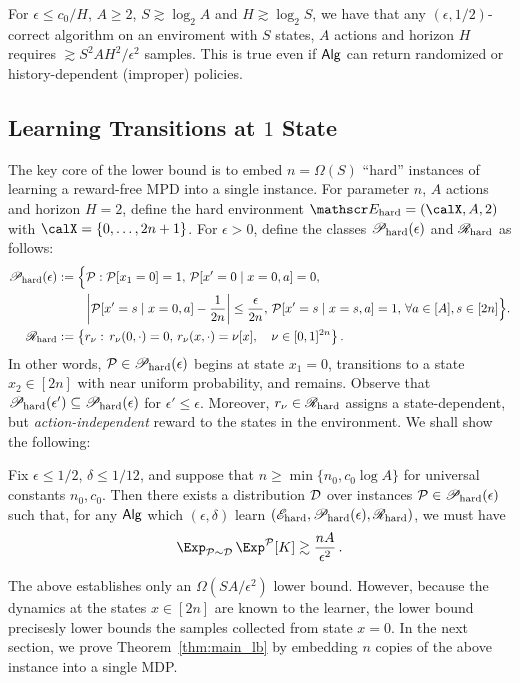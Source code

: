 \begin{theorem}\label{thm:main_lb} For $\epsilon \le c_0/H$, $A \ge 2$, $S \gtrsim \log_2 A$ and $H \gtrsim \log_2 S$, we have that any $(\epsilon,1/2)$-correct algorithm on an enviroment with $S$ states, $A$ actions and horizon $H$ requires $\gtrsim S^2 A H^2/\epsilon^2$ samples. This is true even if $\mathsf{Alg}$ can return randomized or history-dependent (improper) policies. 
\end{theorem}


\subsection{Learning Transitions at $1$ State}

The key core of the lower bound is to embed $n = \Omega(S)$  ``hard'' instances of learning a reward-free MPD into a single instance. For parameter $n$, $A$ actions and horizon $H = 2$, define the hard environment $\Ehard = (\calX,A,2)$ with $\calX = \{0,\dots,2n+1\}$. For $\epsilon > 0$, define the classes $\mathscr{P}_{\mathrm{hard}}(\epsilon)$ and $\mathscr{R}_{\mathrm{hard}}$ as follows:
\begin{align*}
\mathscr{P}_{\mathrm{hard}}(\epsilon) &:=  \Big{\{}\mathcal{P}: \mathcal{P}[x_1 = 0] = 1, \,\mathcal{P}[x' = 0 \mid x = 0, a] = 0 , \\
&\qquad \,\left|\mathcal{P}[x' = s \mid x = 0, a] - \frac{1}{2n}\right| \le \frac{\epsilon}{2n},\,\mathcal{P}[x' = s \mid x = s, a] = 1, \, \forall a \in [A], s \in[2n]\Big{\}}.\\
\mathscr{R}_{\mathrm{hard}} &:=  \left\{r_{\nu}:\, r_{\nu}(0,\cdot) = 0,\, r_{\nu}(x,\cdot) = \nu[x], \quad \nu \in [0,1]^{2n}\right\}.
\end{align*}
In other words, $\mathcal{P} \in \mathscr{P}_{\mathrm{hard}}(\epsilon)$ begins at state $x_1 = 0$, transitions to a state $x_2 \in [2n]$ with near uniform probability, and remains. Observe that $\mathscr{P}_{\mathrm{hard}}(\epsilon') \subseteq \mathscr{P}_{\mathrm{hard}}(\epsilon)$ for $\epsilon' \le \epsilon$. Moreover, $r_{\nu} \in \mathscr{R}_{\mathrm{hard}}$ assigns a state-dependent, but \emph{action-independent} reward to the states in the environment.  We shall show the following:
\begin{prop}\label{prop:single_instance} Fix $\epsilon \le 1/2$, $\delta \le 1/12$, and suppose that $n \ge \min\{n_0, c_0 \log A\}$ for universal constants $n_0,c_0$. Then there exists a distribution $\mathcal{D}$ over instances $\mathcal{P} \in \mathscr{P}_{\mathrm{hard}}(\epsilon)$ such that, for any $\mathsf{Alg}$ which $(\epsilon,\delta)$ learn $(\mathscr{E}_{\mathrm{hard}},\mathscr{P}_{\mathrm{hard}}(\epsilon),\mathscr{R}_{\mathrm{hard}})$, we must have
\begin{align*}
\Exp_{\calP \sim \calD}\,\Exp^{\calP}[K] \gtrsim \frac{nA}{\epsilon^2}\,.
\end{align*}
\end{prop}
The above establishes only an $\Omega(SA/\epsilon^2)$ lower bound. However, because the dynamics at the states $x \in [2n]$ are known to the learner, the lower bound precisesly lower bounds the samples collected from state $x = 0$. In the next section, we prove Theorem~\ref{thm:main_lb} by embedding $n$ copies of the above instance into a single MDP.

